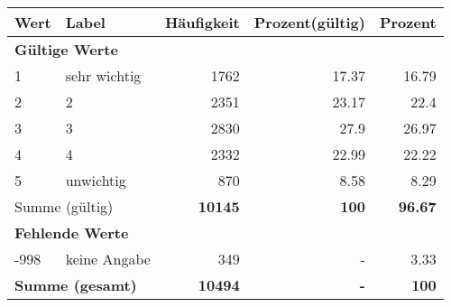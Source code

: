      \begin{longtable}{lXrrr}
     \toprule
     \textbf{Wert} & \textbf{Label} & \textbf{Häufigkeit} & \textbf{Prozent(gültig)} & \textbf{Prozent} \\
     \endhead
     \midrule
     \multicolumn{5}{l}{\textbf{Gültige Werte}}\\

     1 &
     \multicolumn{1}{X}{ sehr wichtig   } &


       \num{1762} &
       \num[round-mode=places,round-precision=2]{17.37} &
         \num[round-mode=places,round-precision=2]{16.79} \\

     2 &
     \multicolumn{1}{X}{ 2   } &


       \num{2351} &
       \num[round-mode=places,round-precision=2]{23.17} &
         \num[round-mode=places,round-precision=2]{22.4} \\

     3 &
     \multicolumn{1}{X}{ 3   } &


       \num{2830} &
       \num[round-mode=places,round-precision=2]{27.9} &
         \num[round-mode=places,round-precision=2]{26.97} \\

     4 &
     \multicolumn{1}{X}{ 4   } &


       \num{2332} &
       \num[round-mode=places,round-precision=2]{22.99} &
         \num[round-mode=places,round-precision=2]{22.22} \\

     5 &
     \multicolumn{1}{X}{ unwichtig   } &


       \num{870} &
       \num[round-mode=places,round-precision=2]{8.58} &
         \num[round-mode=places,round-precision=2]{8.29} \\
     \midrule
     \multicolumn{2}{l}{Summe (gültig)} &
       \textbf{\num{10145}} &
     \textbf{\num{100}} &
       \textbf{\num[round-mode=places,round-precision=2]{96.67}} \\
     \multicolumn{5}{l}{\textbf{Fehlende Werte}}\\
       -998 &
       keine Angabe &
         \num{349} &
        - &
         \num[round-mode=places,round-precision=2]{3.33} \\
     \midrule
     \multicolumn{2}{l}{\textbf{Summe (gesamt)}} &
          \textbf{\num{10494}} &
        \textbf{-} &
        \textbf{\num{100}} \\
     \bottomrule
     \end{longtable}
     
